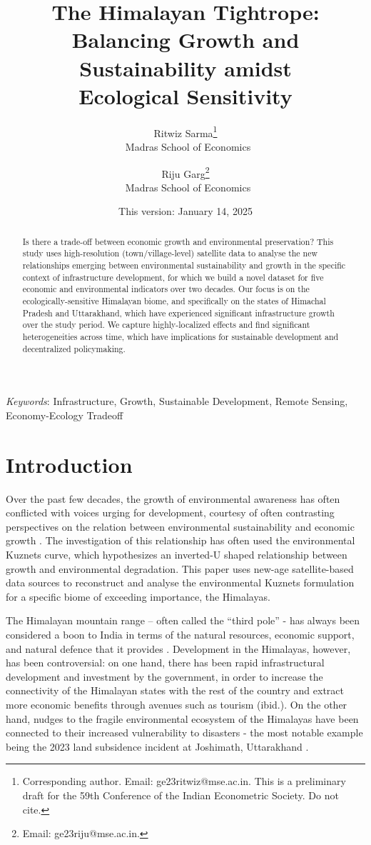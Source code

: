 \documentclass[a4paper,12pt]{article}
\title{\LARGE The Himalayan Tightrope:\\ \Large Balancing Growth and Sustainability amidst\\ Ecological Sensitivity}
\author{Ritwiz Sarma\thanks{Corresponding author. Email: ge23ritwiz@mse.ac.in. This is a preliminary draft for the 59th Conference of the Indian Econometric Society. Do not cite.}\\\small~Madras School of Economics \and Riju Garg\thanks{Email: ge23riju@mse.ac.in.}\\\small~Madras School of Economics} %
\date{This version: January 14, 2025}
\begin{document}
\pagestyle{empty}
\maketitle
\begin{abstract}

    Is there a trade-off between economic growth and environmental preservation? This study uses high-resolution (town/village-level) satellite data to analyse the new relationships emerging between environmental sustainability and growth in the specific context of infrastructure development, for which we build a novel dataset for five economic and environmental indicators over two decades. Our focus is on the ecologically-sensitive Himalayan biome, and specifically on the states of Himachal Pradesh and Uttarakhand, which have experienced significant infrastructure growth over the study period. We capture highly-localized effects and find significant heterogeneities across time, which have implications for sustainable development and decentralized policymaking.

\end{abstract}
\vfill
\textit{Keywords}: Infrastructure, Growth, Sustainable Development, Remote Sensing, Economy-Ecology Tradeoff
\newpage
{}
\pagestyle{plain}

\section{Introduction}


Over the past few decades, the growth of environmental awareness has often conflicted with voices urging for development, courtesy of often contrasting perspectives on the relation between environmental sustainability and economic growth \parencite{arrow1995,grossman1991,grossman1995,list1999,selden1994,shafik1992}. The investigation of this relationship has often used the environmental Kuznets curve, which hypothesizes an inverted-U shaped relationship between growth and environmental degradation. This paper uses new-age satellite-based data sources to reconstruct and analyse the environmental Kuznets formulation for a specific biome of exceeding importance, the Himalayas.

The Himalayan mountain range – often called the “third pole” - has always been considered a boon to India in terms of the natural resources, economic support, and natural defence that it provides \parencite{dyola2024}. Development in the Himalayas, however, has been controversial: on one hand, there has been rapid infrastructural development and investment by the government, in order to increase the connectivity of the Himalayan states with the rest of the country and extract more economic benefits through avenues such as tourism (ibid.). On the other hand, nudges to the fragile environmental ecosystem of the Himalayas have been connected to their increased vulnerability to disasters - the most notable example being the 2023 land subsidence incident at Joshimath, Uttarakhand \parencite{sharma2023}.
\end{document}
